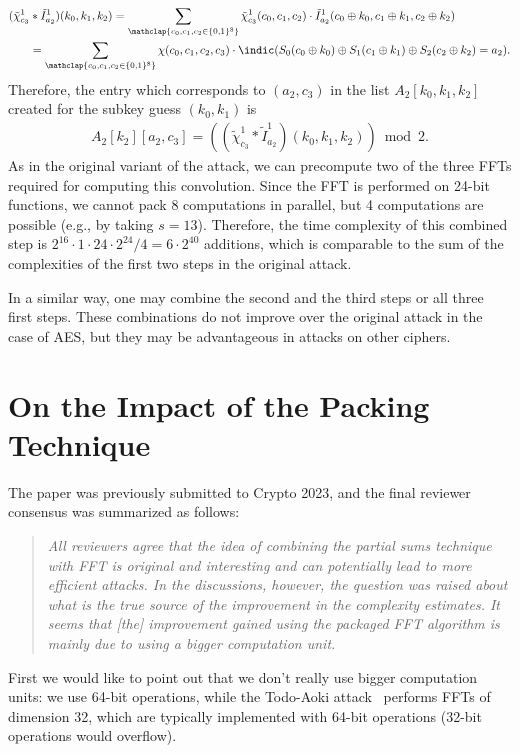 \begin{align*}
    (\tilde{\chi}^1_{c_3}& * \tilde{I}^1_{a_2})(k_0,k_1,k_2) = \sum_{\mathclap{c_0,c_1,c_2 \in \{0,1\}^8}} \tilde{\chi}^1_{c_3}(c_0,c_1,c_2) \cdot \tilde{I}^1_{a_2}(c_0 \oplus k_0,c_1 \oplus k_1, c_2 \oplus k_2) \\
    &= \sum_{\mathclap{c_0,c_1,c_2 \in \{0,1\}^8}} \chi(c_0,c_1,c_2,c_3) \cdot \indic(S_0(c_0 \oplus k_0) \oplus S_1(c_1 \oplus k_1) \oplus S_2(c_2 \oplus k_2) = a_2).
\end{align*}
Therefore, the entry which corresponds to $(a_2,c_3)$ in the list $A_2[k_0,k_1,k_2]$ created for the subkey guess $(k_0,k_1)$ is 
\begin{align}
    A_2[k_2][a_2,c_3]=\left((\tilde{\chi}^1_{c_3} * \tilde{I}^1_{a_2})(k_0,k_1,k_2)\right) \bmod 2.
\end{align}
As in the original variant of the attack, we can precompute two of the three FFTs required for computing this convolution. Since the FFT is performed on 24-bit functions, we cannot pack 8 computations in parallel, but 4 computations are possible (e.g., by taking $s=13$). Therefore, the time complexity of this combined step is $2^{16} \cdot 1 \cdot 24 \cdot 2^{24}/4 = 6 \cdot 2^{40}$ additions, which is comparable to the sum of the complexities of the first two steps in the original attack. 

In a similar way, one may combine the second and the third steps or all three first steps. These combinations do not improve over the original attack in the case of AES, but they may be advantageous in attacks on other ciphers.



\section{On the Impact of the Packing Technique}
\label{app:review}

\iffalse
The paper was previously submitted to Crypto 2023, and the final reviewer
consensus was summarized as follows:
\begin{quote}
\itshape
All reviewers agree that the idea of combining the partial sums technique with FFT is original and interesting and can potentially lead to more efficient attacks. In the discussions, however, the question was raised about what is the true source of the improvement in the complexity estimates. It seems that [the] improvement gained using the packaged FFT algorithm is mainly due to using a bigger computation unit.
\end{quote}
First we would like to point out that we don't really use bigger
computation units: we use 64-bit operations, while the Todo-Aoki
attack~\cite{CANS:TodAok14} performs FFTs of dimension 32, which are
typically implemented with 64-bit operations (32-bit operations would
overflow).

